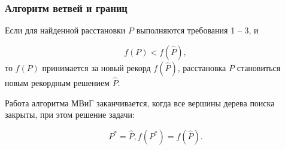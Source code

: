 \begin{frame}
    \fontsize{8pt}{7.2}\selectfont
    \frametitle{Алгоритм ветвей и границ}
    \justifying
    Если для найденной расстановки $P$ выполняются требования 1 – 3, и

    \begin{displaymath}
        f(P) < f(\widehat{P}),
    \end{displaymath}
    то $f(P)$ принимается за новый рекорд $f(\widehat{P})$, расстановка $P$ становиться новым рекордным решением $\widehat{P}$.

    \bigskip
    Работа алгоритма МВиГ заканчивается, когда все вершины дерева поиска закрыты, при этом решение задачи: 

    \begin{displaymath}
        P^{*} = \widehat{P},  f(P^*) = f(\widehat{P}).
    \end{displaymath}

    \bigskip
    \bigskip
\end{frame}

